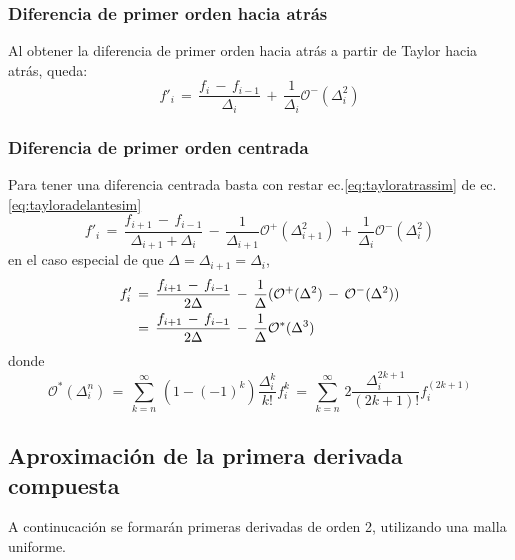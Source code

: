 \documentclass[9pt,technote,twoside,letterpaper,onecolumn]{IEEEtran}
\begin{document}
\begin{multicols}{2}
\subsubsection{Diferencia de primer orden hacia atrás}
\label{sec:dif1Db}
Al obtener la diferencia de primer orden hacia atrás a partir de Taylor hacia atrás, queda: 
\begin{equation}
  f'_i\,=\,\frac{f_i\,-\,f_{i-1}}{\Delta_i}\,+\,\frac{1}{\Delta_i}\mathcal{O}^-(\Delta^2_i)
  \label{eq:apprx1dO2b}
\end{equation}

\subsubsection{Diferencia de primer orden centrada}
\label{sec:dif1Dc}
 Para tener una diferencia centrada basta con restar ec.\ref{eq:tayloratrassim} de ec.\ref{eq:tayloradelantesim}
\begin{equation}
  f'_i\,=\,\frac{f_{i+1}\,-\,f_{i-1}}{\Delta_{i+1}+\Delta_i}\,-\,\frac{1}{\Delta_{i+1}}\mathcal{O}^+(\Delta^2_{i+1})\,+\,\frac{1}{\Delta_i}\mathcal{O}^-(\Delta^2_i)
  \label{eq:apprx1dO2c}
\end{equation}
en el caso especial de que $\Delta=\Delta_{i+1}=\Delta_i$,
\begin{align}
  f'_i&\,=\,\frac{f_{i+1}\,-\,f_{i-1}}{2\Delta}\,-\,\frac{1}{\Delta}(\mathcal{O}^+(\Delta^2)\,-\,\mathcal{O}^-(\Delta^2))\notag\\
  &\,=\,\frac{f_{i+1}\,-\,f_{i-1}}{2\Delta}\,-\,\frac{1}{\Delta}\mathcal{O}^*(\Delta^3)
  \label{eq:apprx1dO2cEq}
\end{align}
donde 
\[
\mathcal{O}^*(\Delta^n_{i})\,=\,\sum^\infty_{k=n}\,(1-(-1)^k)\frac{\Delta^k_i}{k!}f^{k}_i\,=\,\sum^\infty_{k=n}\,2\frac{\Delta^{2k+1}_i}{(2k+1)!}f^{(2k+1)}_i
\]

\subsection{Aproximación de la primera derivada compuesta}
\label{sec:primdercompu}
A continucación se formarán primeras derivadas de orden 2, utilizando una malla uniforme.


\end{multicols}
\end{document}
